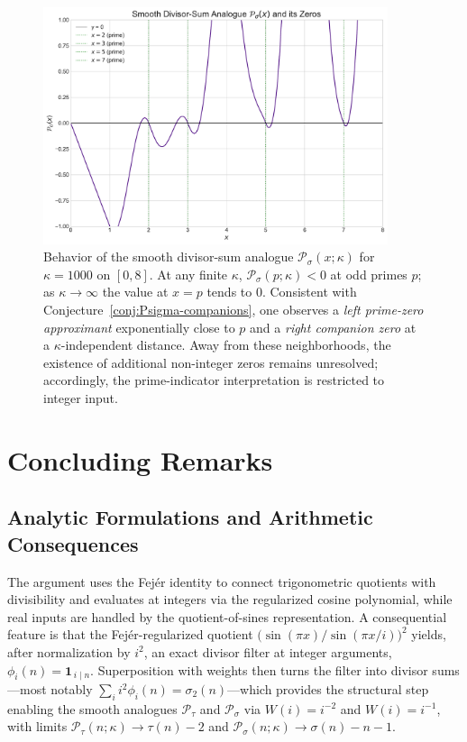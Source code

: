 \documentclass[11pt,a4paper]{amsart}
\theoremstyle{plain}
\theoremstyle{definition}
\theoremstyle{remark}
\begin{document}
\begin{figure}[!htbp]
\centering
\includegraphics[width=0.9\textwidth]{plot_P_sigma_zeros.pdf}
\caption{Behavior of the smooth divisor-sum analogue $\mathcal{P}_{\sigma}(x; \kappa)$ for $\kappa=1000$ on $[0,8]$.
At any finite $\kappa$, $\mathcal P_\sigma(p;\kappa)<0$ at odd primes $p$; as $\kappa\to\infty$ the value at $x=p$ tends to $0$. Consistent with Conjecture~\ref{conj:Psigma-companions}, one observes a \emph{left prime-zero approximant} exponentially close to $p$ and a \emph{right companion zero} at a $\kappa$-independent distance. Away from these neighborhoods, the existence of additional non-integer zeros remains unresolved; accordingly, the prime-indicator interpretation is restricted to integer input.}
\label{fig:P_sigma}
\end{figure}

\FloatBarrier

\section{Concluding Remarks}

\subsection{Analytic Formulations and Arithmetic Consequences}
The argument uses the Fejér identity to connect trigonometric quotients with divisibility and evaluates at integers via the regularized cosine polynomial, while real inputs are handled by the quotient-of-sines representation. A consequential feature is that the Fejér-regularized quotient \(\bigl(\sin(\pi x)/\sin(\pi x/i)\bigr)^2\) yields, after normalization by \(i^2\), an exact divisor filter at integer arguments, \(\phi_i(n)=\mathbf{1}_{\,i\mid n}\). Superposition with weights then turns the filter into divisor sums—most notably \(\sum_i i^{2}\phi_i(n)=\sigma_{2}(n)\)—which provides the structural step enabling the smooth analogues \(\mathcal{P}_{\tau}\) and \(\mathcal{P}_{\sigma}\) via \(W(i)=i^{-2}\) and \(W(i)=i^{-1}\), with limits \(\mathcal{P}_{\tau}(n;\kappa)\to\tau(n)-2\) and \(\mathcal{P}_{\sigma}(n;\kappa)\to\sigma(n)-n-1\).
\end{document}
